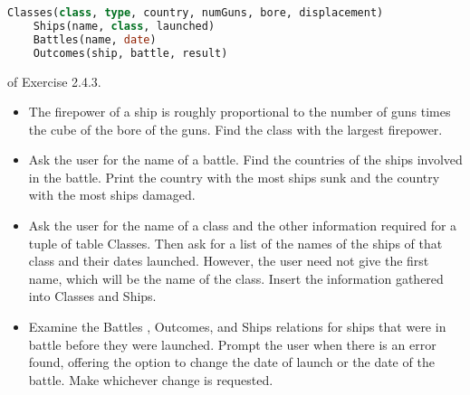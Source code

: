 \documentclass[12pt]{article}
\begin{document}
\begin{enumerate}[1.]
    \begin{lstlisting}[language=SQL]
    Classes(class, type, country, numGuns, bore, displacement)
    Ships(name, class, launched)
    Battles(name, date)
    Outcomes(ship, battle, result)
    \end{lstlisting}

    \bigskip

    of Exercise 2.4.3.

    \bigskip

    \begin{itemize}
        \item The firepower of a ship is roughly proportional to the number of guns times the cube of the bore of the guns. Find the class with the largest firepower.
        \item Ask the user for the name of a battle. Find the countries of the ships involved in the battle. Print the country with the most ships sunk and the country with the most ships damaged.
        \item Ask the user for the name of a class and the other information required for a tuple of table Classes. Then ask for a list of the names of the ships of that class and their dates launched. However, the user need not give the first name, which will be the name of the class. Insert the information gathered into Classes and Ships.
        \item Examine the Battles , Outcomes, and Ships relations for ships that were in battle before they were launched. Prompt the user when there is an error found, offering the option to change the date of launch or the date of the battle. Make whichever change is requested.
    \end{itemize}

\end{enumerate}
\end{document}
